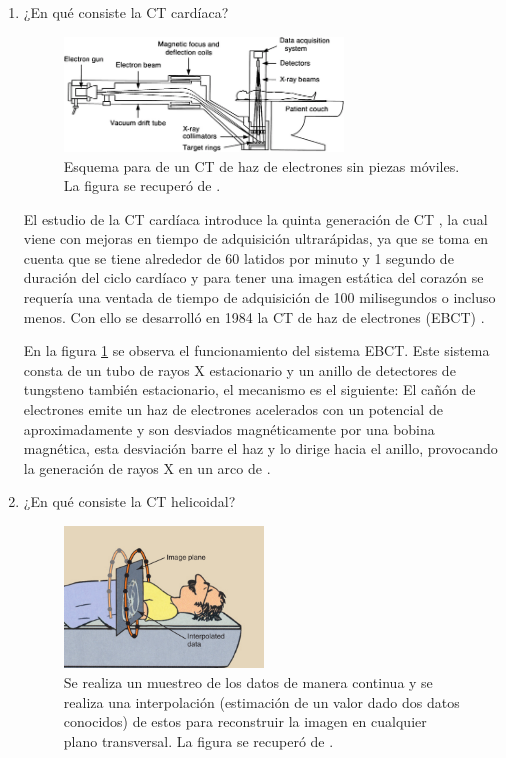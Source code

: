 \newlength{\strutheight}
\settoheight{\strutheight}{\strut}


\begin{enumerate}[1.]
\item ¿En qué consiste la CT cardíaca?



\begin{figure}[!ht]
\centering
\includegraphics[width=0.7\textwidth]{./figuras/40134_2012_5_Fig13_HTML.png}
\caption{Esquema para de un CT de haz de electrones sin piezas móviles. La figura se recuperó de \citep{Flohr}.}
\label{p1:ct}
\end{figure}

El estudio de la CT cardíaca introduce la quinta generación de CT \citep{IM}, la cual viene con mejoras en tiempo de adquisición ultrarápidas, ya que se toma en cuenta que se tiene alrededor de 60 latidos por minuto y 1 segundo de duración del ciclo cardíaco y para tener una imagen estática del corazón se requería una ventada de tiempo de adquisición de 100 milisegundos o incluso menos. Con ello se desarrolló en 1984 la CT de haz de electrones (EBCT)  \citep{jerro}.


En la figura \ref{p1:ct} se observa el funcionamiento del sistema EBCT. Este sistema consta de un tubo de rayos X estacionario y un anillo de detectores de tungsteno también estacionario, el mecanismo es el siguiente: El cañón de electrones emite un haz de electrones acelerados con un potencial de aproximadamente   y son desviados magnéticamente por una bobina magnética, esta desviación barre el haz y lo dirige hacia el anillo, provocando la generación de rayos X en un arco de   \citep{Flohr,jerro}. 


\item  ¿En qué consiste la CT helicoidal?


\begin{figure}[!ht]
  \centering
  \includegraphics[width=0.5\textwidth]{./figuras/p2_ct.png}
  \caption{Se realiza un muestreo de los datos de manera continua y se realiza una interpolación (estimación de un valor dado dos datos conocidos) de estos para reconstruir la imagen en cualquier plano transversal. La figura se recuperó de \citep{stewart}.}
  \label{p2:ct}
  \end{figure}


\end{enumerate}
